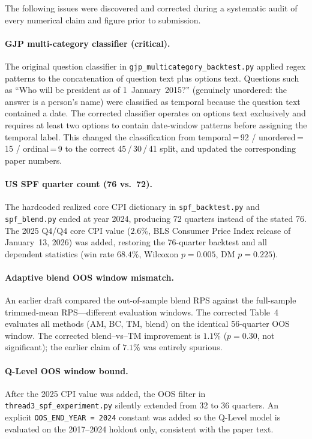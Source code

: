 The following issues were discovered and corrected during a systematic audit of every numerical
claim and figure prior to submission.

\paragraph{GJP multi-category classifier (critical).}
The original question classifier in \texttt{gjp\_multicategory\_backtest.py} applied regex
patterns to the concatenation of question text plus options text.
Questions such as ``Who will be president as of 1~January~2015?'' (genuinely unordered: the
answer is a person's name) were classified as temporal because the question text contained a
date.  The corrected classifier operates on options text exclusively and requires at least two
options to contain date-window patterns before assigning the temporal label.
This changed the classification from temporal\,=\,92 / unordered\,=\,15 / ordinal\,=\,9 to
the correct 45\,/\,30\,/\,41 split, and updated the corresponding paper numbers.

\paragraph{US SPF quarter count (76 vs.\ 72).}
The hardcoded realized core CPI dictionary in \texttt{spf\_backtest.py} and
\texttt{spf\_blend.py} ended at year 2024, producing 72 quarters instead of the stated 76.
The 2025 Q4/Q4 core CPI value ($2.6\%$, BLS Consumer Price Index release of January~13,
2026) was added, restoring the 76-quarter backtest and all dependent statistics
(win rate $68.4\%$, Wilcoxon $p=0.005$, DM $p=0.225$).

\paragraph{Adaptive blend OOS window mismatch.}
An earlier draft compared the out-of-sample blend RPS against the full-sample trimmed-mean
RPS---different evaluation windows.  The corrected Table~4 evaluates all methods
(AM, BC, TM, blend) on the identical 56-quarter OOS window.
The corrected blend--vs--TM improvement is $1.1\%$ ($p=0.30$, not significant); the
earlier claim of $7.1\%$ was entirely spurious.

\paragraph{Q-Level OOS window bound.}
After the 2025 CPI value was added, the OOS filter in \texttt{thread3\_spf\_experiment.py}
silently extended from 32 to 36 quarters.  An explicit \texttt{OOS\_END\_YEAR\,=\,2024}
constant was added so the Q-Level model is evaluated on the 2017--2024 holdout only,
consistent with the paper text.

